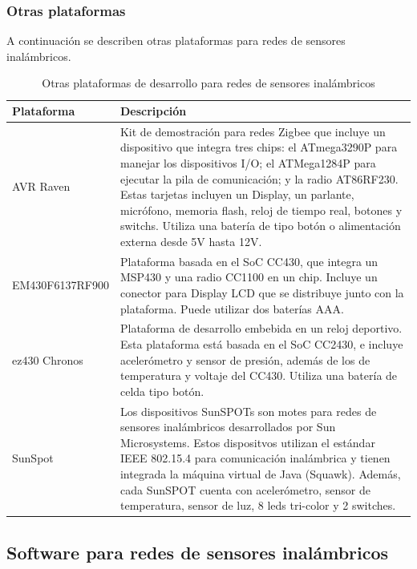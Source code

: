 \subsubsection{Otras plataformas}
A continuación se describen otras plataformas para redes de sensores inalámbricos.
\begin{table}[H]
\centering
\caption{Otras plataformas de desarrollo para redes de sensores inalámbricos}
\begin{tabular}{|l|p{10cm}|}
\hline \textbf{Plataforma} & \textbf{Descripción} \\ 
\hline AVR Raven & Kit de demostración para redes Zigbee que incluye un dispositivo que integra tres chips: el ATmega3290P para manejar los dispositivos I/O; el ATMega1284P para ejecutar la pila de comunicación; y la radio AT86RF230. Estas tarjetas incluyen un Display, un parlante, micrófono, memoria flash, reloj de tiempo real, botones y switchs. Utiliza una batería de tipo botón o alimentación externa desde 5V hasta 12V.\\
\hline EM430F6137RF900 & Plataforma basada en el SoC CC430, que integra un MSP430 y una radio CC1100 en un chip. Incluye un conector para Display LCD que se distribuye junto con la plataforma. Puede utilizar dos baterías AAA. \\ 
\hline ez430 Chronos & Plataforma de desarrollo embebida en un reloj deportivo. Esta plataforma está basada en el SoC CC2430, e incluye acelerómetro y sensor de presión, además de los de temperatura y voltaje del CC430. Utiliza una batería de celda tipo botón.\\ 
\hline SunSpot & Los dispositivos SunSPOTs son motes para redes de sensores inalámbricos desarrollados por Sun Microsystems. Estos dispositvos utilizan el estándar IEEE 802.15.4 para comunicación inalámbrica y tienen integrada la máquina virtual de Java (Squawk). Además, cada SunSPOT cuenta con acelerómetro, sensor de temperatura, sensor de luz, 8 leds tri-color y 2 switches. \\ 
\hline 
\end{tabular} 
\end{table}


\subsection{Software para redes de sensores inalámbricos}
